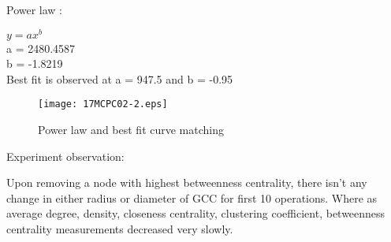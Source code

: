 \documentclass[10pt,a4paper]{article}
\begin{document}
\noindent Power law : 

\noindent $ y = ax^{b} $ \\
\noindent a = 2480.4587 \\
b = -1.8219 \\
Best fit is observed at a = 947.5 and b = -0.95


\begin{figure}[h]
	\centering
	\texttt{[image: 17MCPC02-2.eps]}
	\caption{Power law and best fit curve matching}
\end{figure}	

\begin{flushleft}
	Experiment observation:
\end{flushleft}

Upon removing a node with highest betweenness centrality, there isn't any change in either radius or diameter of GCC for first 10 operations. Where as average degree, density, closeness centrality, clustering coefficient, betweenness centrality measurements decreased very slowly. 
 

	                	
\end{document}
